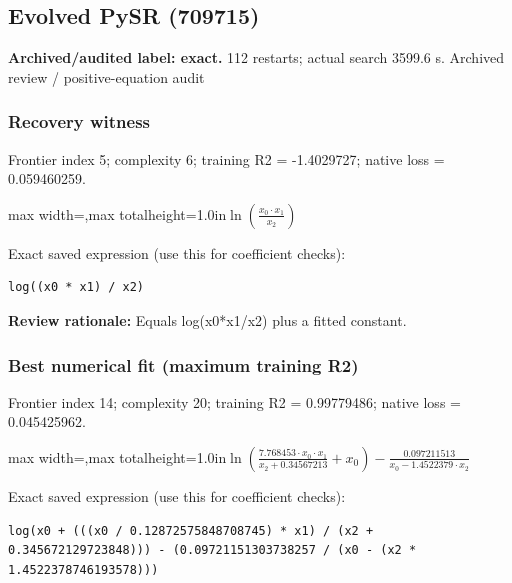 \documentclass[10pt,letterpaper,landscape]{article}
\begin{document}
\begin{minipage}[t]{0.485\textwidth}
\subsection*{Evolved PySR (709715)}
\textbf{Archived/audited label: exact.} 112 restarts; actual search 3599.6 s.
{\small Archived review / positive-equation audit}
\subsubsection*{Recovery witness}
Frontier index 5; complexity 6; training R2 = -1.4029727; native loss = 0.059460259.
\begin{center}\begin{adjustbox}{max width=\linewidth,max totalheight=1.0in}$\displaystyle \ln{\left(\frac{x_{0} \cdot x_{1}}{x_{2}} \right)}$\end{adjustbox}\end{center}
{\scriptsize Exact saved expression (use this for coefficient checks):}
\begin{lstlisting}
log((x0 * x1) / x2)
\end{lstlisting}
{\small\textbf{Review rationale:} Equals log(x0*x1/x2) plus a fitted constant.}
\subsubsection*{Best numerical fit (maximum training R2)}
Frontier index 14; complexity 20; training R2 = 0.99779486; native loss = 0.045425962.
\begin{center}\begin{adjustbox}{max width=\linewidth,max totalheight=1.0in}$\displaystyle \ln{\left(\frac{7.768453 \cdot x_{0} \cdot x_{1}}{x_{2} + 0.34567213} + x_{0} \right)} - \frac{0.097211513}{x_{0} - 1.4522379 \cdot x_{2}}$\end{adjustbox}\end{center}
{\scriptsize Exact saved expression (use this for coefficient checks):}
\begin{lstlisting}
log(x0 + (((x0 / 0.12872575848708745) * x1) / (x2 + 0.345672129723848))) - (0.09721151303738257 / (x0 - (x2 * 1.4522378746193578)))
\end{lstlisting}
\end{minipage}
\clearpage{}\label{ideal_gas-10002}
\end{document}
